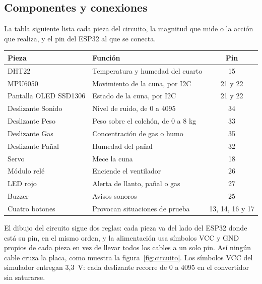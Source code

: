 \subsection{Componentes y conexiones}

La tabla siguiente lista cada pieza del circuito, la magnitud que mide o la acción que
realiza, y el pin del ESP32 al que se conecta.

\begin{center}
\small
\begin{tabular}{llc}
\hline
\textbf{Pieza} & \textbf{Función} & \textbf{Pin} \\
\hline
DHT22                  & Temperatura y humedad del cuarto & 15 \\
MPU6050                & Movimiento de la cuna, por I2C   & 21 y 22 \\
Pantalla OLED SSD1306  & Estado de la cuna, por I2C       & 21 y 22 \\
Deslizante Sonido      & Nivel de ruido, de 0 a 4095      & 34 \\
Deslizante Peso        & Peso sobre el colchón, de 0 a 8 kg & 33 \\
Deslizante Gas         & Concentración de gas o humo      & 35 \\
Deslizante Pañal       & Humedad del pañal                & 32 \\
Servo                  & Mece la cuna                     & 18 \\
Módulo relé            & Enciende el ventilador           & 26 \\
LED rojo               & Alerta de llanto, pañal o gas    & 27 \\
Buzzer                 & Avisos sonoros                   & 25 \\
Cuatro botones         & Provocan situaciones de prueba   & 13, 14, 16 y 17 \\
\hline
\end{tabular}
\end{center}

El dibujo del circuito sigue dos reglas: cada pieza va del lado del ESP32 donde está su
pin, en el mismo orden, y la alimentación usa símbolos VCC y GND propios de cada pieza
en vez de llevar todos los cables a un solo pin. Así ningún cable cruza la placa, como
muestra la figura~\ref{fig:circuito}. Los símbolos VCC del simulador entregan 3,3~V:
cada deslizante recorre de 0 a 4095 en el convertidor sin saturarse.

